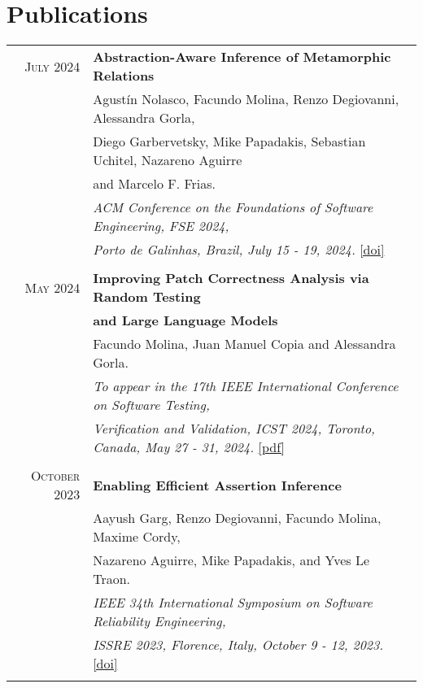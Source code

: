 \documentclass[a4paper,10pt]{article} %
\begin{document}
\section{Publications}
\begin{longtable}{rl}

\textsc{July} 2024  & \textbf{Abstraction-Aware Inference of Metamorphic Relations} \\
        & Agustín Nolasco, Facundo Molina, Renzo Degiovanni, Alessandra Gorla, \\ 
        & Diego Garbervetsky, Mike Papadakis, Sebastian Uchitel, Nazareno Aguirre \\
        & and Marcelo F. Frias. \\
        & \textit{ACM Conference on the Foundations of Software Engineering, FSE 2024,} \\
        & \textit{Porto de Galinhas, Brazil, July 15 - 19, 2024.} \href{https://dl.acm.org/doi/10.1145/3643747}{[doi]} \\ & \\

\textsc{May} 2024  & \textbf{Improving Patch Correctness Analysis via Random Testing} \\
        & \textbf{and Large Language Models} \\
        & Facundo Molina, Juan Manuel Copia and Alessandra Gorla. \\
        & \textit{To appear in the 17th IEEE International Conference on Software Testing,} \\
        & \textit{Verification and Validation, ICST 2024, Toronto, Canada, May 27 - 31, 2024.} \href{https://facumolina.github.io/files/MOLINA_ETAL_ICST2024.pdf}{[pdf]} \\ & \\

\textsc{October} 2023  & \textbf{Enabling Efficient Assertion Inference} \\
        & Aayush Garg, Renzo Degiovanni, Facundo Molina, Maxime Cordy,\\
        & Nazareno Aguirre, Mike Papadakis, and Yves Le Traon. \\
        & \textit{IEEE 34th International Symposium on Software Reliability Engineering,} \\
        & \textit{ISSRE 2023, Florence, Italy, October 9 - 12, 2023.} \href{https://doi.ieeecomputersociety.org/10.1109/ISSRE59848.2023.00039}{[doi]}\\ & \\


\end{longtable}
\end{document}
